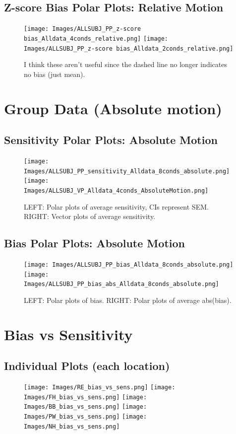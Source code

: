 \documentclass[11pt]{article} %
\begin{document}
\subsection{Z-score Bias Polar Plots: Relative Motion}
\begin{figure}[H]
\centering %
\texttt{[image: Images/ALLSUBJ\_PP\_z-score bias\_Alldata\_4conds\_relative.png]}
\texttt{[image: Images/ALLSUBJ\_PP\_z-score bias\_Alldata\_2conds\_relative.png]}
\caption{I think these aren't useful since the dashed line no longer indicates no bias (just mean).}
\end{figure}


\newpage
\section{Group Data (Absolute motion)}
\subsection{Sensitivity Polar Plots: Absolute Motion}
\begin{figure}[H]
\centering %
\texttt{[image: Images/ALLSUBJ\_PP\_sensitivity\_Alldata\_8conds\_absolute.png]}
\texttt{[image: Images/ALLSUBJ\_VP\_Alldata\_4conds\_AbsoluteMotion.png]}
\caption{LEFT: Polar plots of average sensitivity, CIs represent SEM. RIGHT: Vector plots of average sensitivity.}
\end{figure}
\subsection{Bias Polar Plots: Absolute Motion}
\begin{figure}[H]
\centering %
\texttt{[image: Images/ALLSUBJ\_PP\_bias\_Alldata\_8conds\_absolute.png]}
\texttt{[image: Images/ALLSUBJ\_PP\_bias\_abs\_Alldata\_8conds\_absolute.png]}
\caption{LEFT: Polar plots of bias. RIGHT: Polar plots of average abs(bias).}
\end{figure}

\newpage
\section{Bias vs Sensitivity}
\subsection{Individual Plots (each location)}
\begin{figure}[H]
\centering %
\texttt{[image: Images/RE\_bias\_vs\_sens.png]}
\texttt{[image: Images/FH\_bias\_vs\_sens.png]}
\texttt{[image: Images/BB\_bias\_vs\_sens.png]}
\texttt{[image: Images/PW\_bias\_vs\_sens.png]}
\texttt{[image: Images/NH\_bias\_vs\_sens.png]}
\end{figure}
\end{document}
